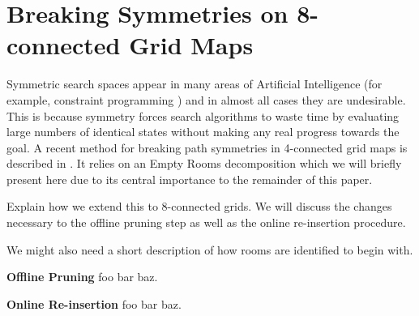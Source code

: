 \section{Breaking Symmetries on 8-connected Grid Maps}
Symmetric search spaces appear in many areas of Artificial Intelligence (for example, constraint programming \cite{walsh07})
and in almost all cases they are undesirable. 
This is because symmetry forces search algorithms to waste time by evaluating
large numbers of identical states without making any real progress towards the goal.
A recent method for breaking path symmetries in 4-connected grid maps is described in \cite{harabor10}.
It relies on an Empty Rooms decomposition which we will briefly present here due to its central importance to the
remainder of this paper.
\par
Explain how we extend this to 8-connected grids.
We will discuss the changes necessary to the offline
pruning step as well as the online re-insertion procedure.

We might also need a short description of how rooms are identified to begin with.

\textbf{Offline Pruning} foo bar baz.
\par
\textbf{Online Re-insertion} foo bar baz.
